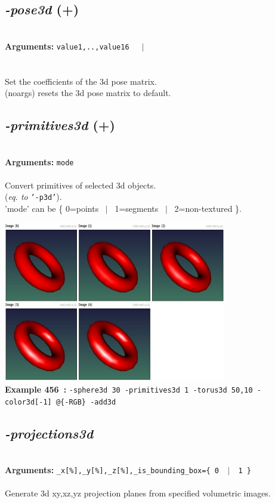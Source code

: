 \documentclass[a4paper,11pt,twoside]{book}
\begin{document}
\subsection{\emph{-pose3d} (+)}\vspace*{-0.5em}
~\\\textbf{Arguments: } 
{\small \texttt{value1,..,value16}}~~~$|$\\
\\~\\
Set the coefficients of the 3d pose matrix.
~\\(noargs) resets the 3d pose matrix to default.


\subsection{\emph{-primitives3d} (+)}\vspace*{-0.5em}
~\\\textbf{Arguments: } 
{\small \texttt{mode}}\\~\\
Convert primitives of selected 3d objects.
~\\(\emph{eq. to} {\small \texttt{'-p3d'}}).
~\\'mode' can be \{ 0=points ~$|$~ 1=segments ~$|$~ 2=non-textured \}.
\begin{center}\includegraphics[keepaspectratio=true,height=7cm,width=\textwidth]{img/gmic_def456.jpg}\\
{\footnotesize \textbf{Example 456~:} \texttt{-sphere3d 30 -primitives3d 1 -torus3d 50,10 -color3d[-1] @\{-RGB\} -add3d}}
\end{center}

\subsection{\emph{-projections3d} }\vspace*{-0.5em}
~\\\textbf{Arguments: } 
{\small \texttt{\_x[\%],\_y[\%],\_z[\%],\_is\_bounding\_box=\{ 0 ~$|$~ 1 \}}}\\~\\
Generate 3d xy,xz,yz projection planes from specified volumetric images.
\end{document}
